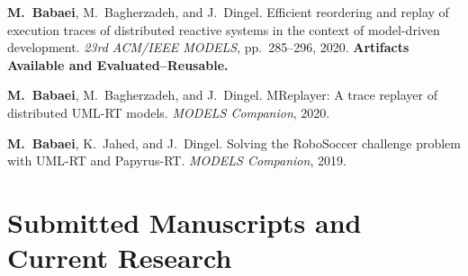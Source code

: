 \documentclass[10pt,letterpaper]{article}
\newcommand{\me}{\textbf{M.~Babaei}}
\begin{document}
\begin{enumerate}[label={[C\arabic*]}]
\item \me, M.\ Bagherzadeh, and J.\ Dingel. Efficient reordering and replay of execution traces of distributed reactive systems in the context of model-driven development. \emph{23rd ACM/IEEE MODELS}, pp.\ 285--296, 2020. \textbf{Artifacts Available and Evaluated--Reusable.}
\item \me, M.\ Bagherzadeh, and J.\ Dingel. MReplayer: A trace replayer of distributed UML-RT models. \emph{MODELS Companion}, 2020.
\item \me, K.\ Jahed, and J.\ Dingel. Solving the RoboSoccer challenge problem with UML-RT and Papyrus-RT. \emph{MODELS Companion}, 2019.
\end{enumerate}

\newpage
\section{Submitted Manuscripts and Current Research}
\end{document}
